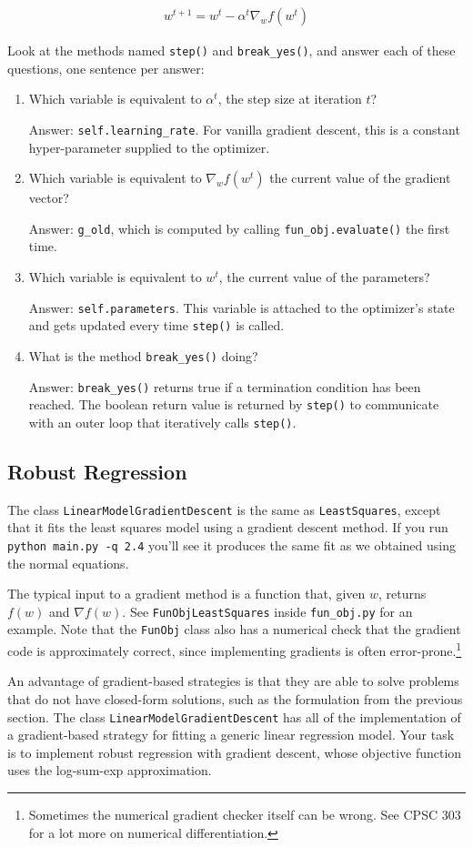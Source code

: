 \documentclass{article}
\def\ans#1{\par\gre{Answer: #1}}
\def\blu#1{{\color{blu}#1}}
\def\gre#1{{\color{gre}#1}}
\def\enum#1{\begin{enumerate}#1\end{enumerate}}
\begin{document}
\begin{align*}
	w^{t+1} = w^t - \alpha^t \nabla_w f(w^t)
\end{align*}

\blu{Look at the methods named \texttt{step()} and \texttt{break\_yes()}, and answer each of these questions, one sentence per answer:
\enum{
	\item Which variable is equivalent to $\alpha^t$, the step size at iteration $t$?
	\ans{\texttt{self.learning\_rate}. For vanilla gradient descent, this is a constant hyper-parameter supplied to the optimizer.}
	\item Which variable is equivalent to $\nabla_w f(w^t)$ the current value of the gradient vector?
	\ans{\texttt{g\_old}, which is computed by calling \texttt{fun\_obj.evaluate()} the first time.}
	\item Which variable is equivalent to $w^t$, the current value of the parameters?
	\ans{\texttt{self.parameters}. This variable is attached to the optimizer's state and gets updated every time \texttt{step()} is called.}
	\item What is the method \texttt{break\_yes()} doing?
	\ans{\texttt{break\_yes()} returns true if a termination condition has been reached. The boolean return value is returned by \texttt{step()} to communicate with an outer loop that iteratively calls \texttt{step()}.}
}
}

\subsection{Robust Regression}

The class \texttt{LinearModelGradientDescent} is the same as \texttt{LeastSquares}, except that it fits the least squares model using a gradient descent method. If you run \verb|python main.py -q 2.4| you'll see it produces the same fit as we obtained using the normal equations.

The typical input to a gradient method is a function that, given $w$, returns $f(w)$ and $\nabla f(w)$. See \texttt{FunObjLeastSquares} inside \texttt{fun\_obj.py} for an example. Note that the \texttt{FunObj} class also has a numerical check that the gradient code is approximately correct, since implementing gradients is often error-prone.\footnote{Sometimes the numerical gradient checker itself can be wrong. See CPSC 303 for a lot more on numerical differentiation.}

An advantage of gradient-based strategies is that they are able to solve
problems that do not have closed-form solutions, such as the formulation from the
previous section. The class \texttt{LinearModelGradientDescent} has all of the implementation of a gradient-based strategy for fitting a generic linear regression model. Your task is to implement robust regression with gradient descent, whose objective function uses the log-sum-exp approximation.
\end{document}
